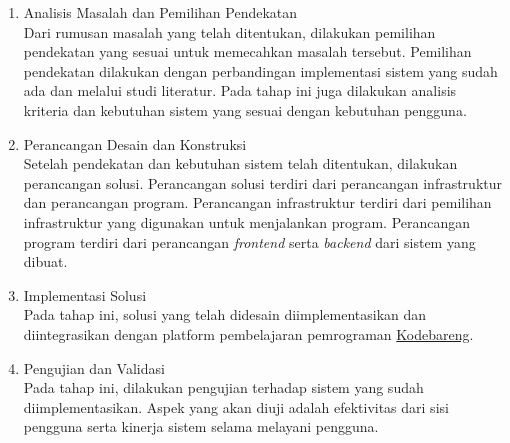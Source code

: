 \begin{enumerate}
      \item Analisis Masalah dan Pemilihan Pendekatan \\
            Dari rumusan masalah yang telah ditentukan, dilakukan pemilihan pendekatan yang sesuai untuk memecahkan masalah tersebut. Pemilihan pendekatan dilakukan dengan perbandingan implementasi sistem yang sudah ada dan melalui studi literatur. Pada tahap ini juga dilakukan analisis kriteria dan kebutuhan sistem yang sesuai dengan kebutuhan pengguna.
      \item Perancangan Desain dan Konstruksi \\
            Setelah pendekatan dan kebutuhan sistem telah ditentukan, dilakukan perancangan solusi. Perancangan solusi terdiri dari perancangan infrastruktur dan perancangan program. Perancangan infrastruktur terdiri dari pemilihan infrastruktur yang digunakan untuk menjalankan program. Perancangan program terdiri dari perancangan \textit{frontend} serta \textit{backend} dari sistem yang dibuat.
      \item Implementasi Solusi \\
            Pada tahap ini, solusi yang telah didesain diimplementasikan dan diintegrasikan dengan platform pembelajaran pemrograman \href{https://kodebareng.id}{Kodebareng}.
      \item Pengujian dan Validasi \\
            Pada tahap ini, dilakukan pengujian terhadap sistem yang sudah diimplementasikan. Aspek yang akan diuji adalah efektivitas dari sisi pengguna serta kinerja sistem selama melayani pengguna.
\end{enumerate}


